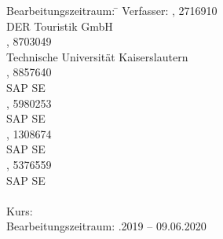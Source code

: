 \begin{titlepage}
\begin{center}
\begin{minipage}{\textwidth}
		\begin{tabbing}
			Bearbeitungszeitraum: \hspace{0.85cm}\=\kill
			Verfasser: \> \authorSG, 2716910 \\
			\> DER Touristik GmbH \\[3mm]
			\> \authorRF, 8703049 \\
			\> Technische Universität Kaiserslautern \\[3mm]
			\> \authorMS, 8857640 \\
			\> SAP SE \\[3mm]
			\> \authorEJ, 5980253 \\
			\> SAP SE \\[3mm]
			\> \authorNL, 1308674 \\
			\> SAP SE \\[3mm]
			\> \authorJR, 5376559 \\
			\> SAP SE \\
			\> \\[1.5mm]
			Kurs: \> \DieKursbezeichnung \\[1.5mm]
			Bearbeitungszeitraum: .2019 -- 09.06.2020
	\end{tabbing}

	\end{minipage}

\end{center}

\end{titlepage}